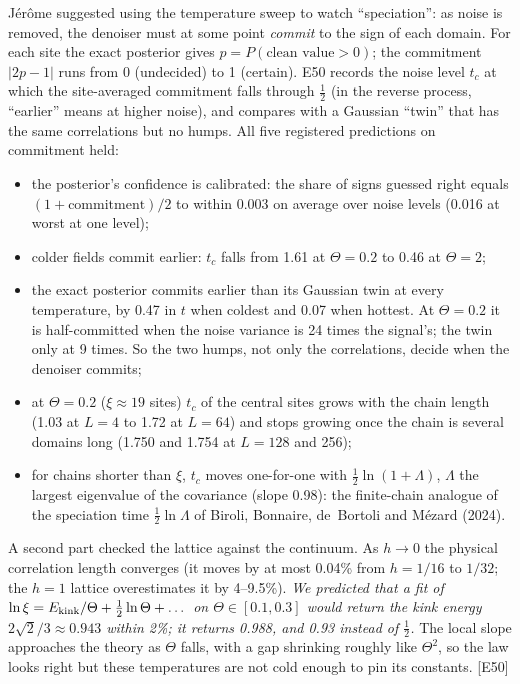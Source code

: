 \documentclass[11pt,a4paper]{article}
\newcommand{\src}[1]{{\footnotesize\color{gray}[#1]}}
\newcommand{\fals}[1]{{\small\itshape #1}}
\begin{document}
Jérôme suggested using the temperature sweep to watch ``speciation'': as noise is removed, the denoiser must at some point
\emph{commit} to the sign of each domain. For each site the exact posterior gives $p=P(\text{clean value}>0)$; the commitment
$|2p-1|$ runs from 0 (undecided) to 1 (certain). E50 records the noise level $t_c$ at which the site-averaged commitment falls through
$\tfrac12$ (in the reverse process, ``earlier'' means at higher noise), and compares with a Gaussian ``twin'' that has the same
correlations but no humps. All five registered predictions on commitment held:
\begin{itemize}
\item the posterior's confidence is calibrated: the share of signs guessed right equals $(1+\text{commitment})/2$ to within 0.003 on average over noise levels (0.016 at worst at one level);
\item colder fields commit earlier: $t_c$ falls from 1.61 at $\Theta=0.2$ to 0.46 at $\Theta=2$;
\item the exact posterior commits earlier than its Gaussian twin at every temperature, by 0.47 in $t$ when coldest and 0.07 when
hottest. At $\Theta=0.2$ it is half-committed when the noise variance is 24 times the signal's; the twin only at 9 times. So the
two humps, not only the correlations, decide when the denoiser commits;
\item at $\Theta=0.2$ ($\xi\approx19$ sites) $t_c$ of the central sites grows with the chain length (1.03 at $L=4$ to 1.72 at $L=64$) and stops growing once
the chain is several domains long (1.750 and 1.754 at $L=128$ and 256);
\item for chains shorter than $\xi$, $t_c$ moves one-for-one with $\tfrac12\ln(1+\Lambda)$, $\Lambda$ the largest eigenvalue of the
covariance (slope 0.98): the finite-chain analogue of the speciation time $\tfrac12\ln\Lambda$ of Biroli, Bonnaire, de~Bortoli and
Mézard (2024).
\end{itemize}
A second part checked the lattice against the continuum. As $h\to0$ the physical correlation length converges (it moves by at most 0.04\%
from $h=1/16$ to $1/32$; the $h=1$ lattice overestimates it by 4--9.5\%). \fals{We predicted that a fit of
$\ln\xi=E_{\rm kink}/\Theta+\tfrac12\ln\Theta+\dots$ on $\Theta\in[0.1,0.3]$ would return the kink energy $2\sqrt2/3\approx0.943$ within
2\%; it returns 0.988, and 0.93 instead of $\tfrac12$.} The local slope approaches the theory as $\Theta$ falls, with a gap
shrinking roughly like $\Theta^2$, so the law looks right but these temperatures are not cold enough to pin its constants. \src{E50}
\end{document}
